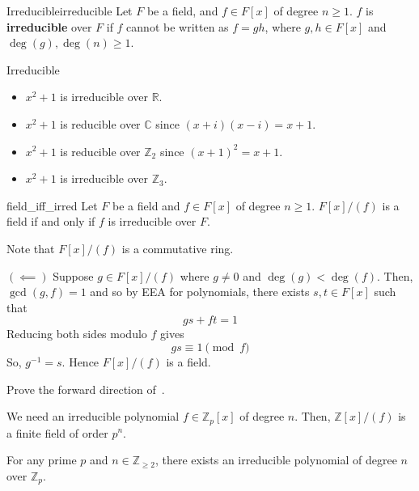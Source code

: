 
\begin{Definition}{Irreducible}{irreducible}
    Let $ F $ be a field, and $ f\in F[x] $ of degree $ n\geqslant 1 $.
    $ f $ is \textbf{irreducible} over $ F $ if $ f $ cannot be written
    as $ f=gh $, where $ g,h\in F[x] $ and $ \deg(g),\deg(n)\geqslant 1 $.
\end{Definition}

\begin{Example}{Irreducible}{}
    \begin{itemize}
        \item $ x^2+1 $ is irreducible over $ \mathbb{R} $.
        \item $ x^2+1 $ is reducible over $ \mathbb{C} $ since $ (x+i)(x-i)=x+1 $.
        \item $ x^2+1 $ is reducible over $ \mathbb{Z}_2 $ since $ (x+1)^2=x+1 $.
        \item $ x^2+1 $ is irreducible over $ \mathbb{Z}_3 $.
    \end{itemize}
\end{Example}

\begin{Theorem}{}{field_iff_irred}
    Let $ F $ be a field and $ f\in F[x] $ of degree $ n\geqslant 1 $.
    $ F[x]/(f) $ is a field if and only if $ f $ is irreducible over $ F $.
\end{Theorem}

\begin{Proof}{}{}
    Note that $ F[x]/(f) $ is a commutative ring.

    $ (\impliedby) $ Suppose $ g\in F[x]/(f) $ where $ g\neq 0 $
    and $ \deg(g)<\deg(f) $. Then, $ \gcd(g,f)=1 $ and so by EEA
    for polynomials, there exists $ s,t\in F[x] $ such that
    \[ gs+ft=1 \]
    Reducing both sides modulo $ f $ gives
    \[ gs\equiv 1 \pmod{f} \]
    So, $ g^{-1}=s $. Hence $ F[x]/(f) $ is a field.
\end{Proof}

\begin{Exercise}{}{}
    Prove the forward direction of~.
\end{Exercise}

We need an irreducible polynomial $ f\in\mathbb{Z}_p[x] $ of degree $ n $.
Then, $ \mathbb{Z}[x]/(f) $ is a finite field of order $ p^n $.

\begin{Theorem}{}{}
    For any prime $ p $ and $ n\in\mathbb{Z}_{\geqslant 2} $, there exists
    an irreducible polynomial of degree $ n $ over $ \mathbb{Z}_p $.
\end{Theorem}

